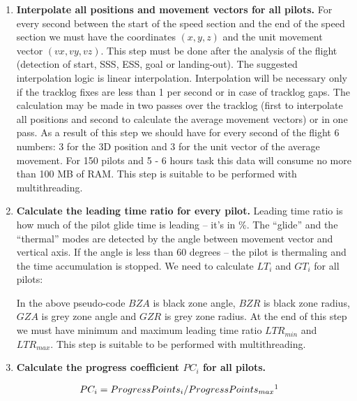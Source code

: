 \documentclass[gap.tex]{subfiles}
\begin{document}
\begin{enumerate}
    \item \textbf{Interpolate all positions and movement vectors for all
        pilots.}  For every second between the start of the speed section and
        the end of the speed section we must have the coordinates \((x, y, z)\)
        and the unit movement vector \((vx, vy, vz)\). This step must be done
        after the analysis of the flight (detection of start, SSS, ESS, goal or
        landing-out). The suggested interpolation logic is linear
        interpolation. Interpolation will be necessary only if the tracklog
        fixes are less than 1 per second or in case of tracklog gaps. The
        calculation may be made in two passes over the tracklog (first to
        interpolate all positions and second to calculate the average movement
        vectors) or in one pass. As a result of this step we should have for
        every second of the flight 6 numbers: 3 for the 3D position and 3 for
        the unit vector of the average movement. For 150 pilots and 5 - 6 hours
        task this data will consume no more than 100 MB of RAM. This step is
        suitable to be performed with multithreading.

    \item \textbf{Calculate the leading time ratio for every pilot.} Leading
        time ratio is how much of the pilot glide time is leading – it’s in \%.
        The “glide” and the “thermal” modes are detected by the angle between
        movement vector and vertical axis. If the angle is less than 60 degrees
        – the pilot is thermaling and the time accumulation is stopped. We need
        to calculate \(LT_i\) and \(GT_i\) for all pilots:

        In the above pseudo-code \(BZA\) is black zone angle, \(BZR\) is black
        zone radius, \(GZA\) is grey zone angle and \(GZR\) is grey zone
        radius. At the end of this step we must have minimum and maximum
        leading time ratio \(LTR_{min}\) and \(LTR_{max}\). This step is
        suitable to be performed with multithreading.

    \item \textbf{Calculate the progress coefficient \(PC_i\) for all pilots.}
        
        \begin{align*}
            PC_i &= ProgressPoints_i / ProgressPoints_{max}\footnotemark
        \end{align*}


\end{enumerate}
\end{document}
